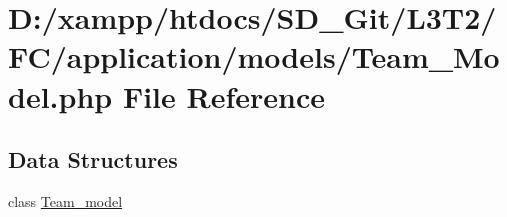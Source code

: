 \hypertarget{_team___model_8php}{}\section{D\+:/xampp/htdocs/\+S\+D\+\_\+\+Git/\+L3\+T2/\+F\+C/application/models/\+Team\+\_\+\+Model.php File Reference}
\label{_team___model_8php}
\subsection*{Data Structures}
\begin{DoxyCompactItemize}
\item 
class \hyperlink{class_team__model}{Team\+\_\+model}
\end{DoxyCompactItemize}
